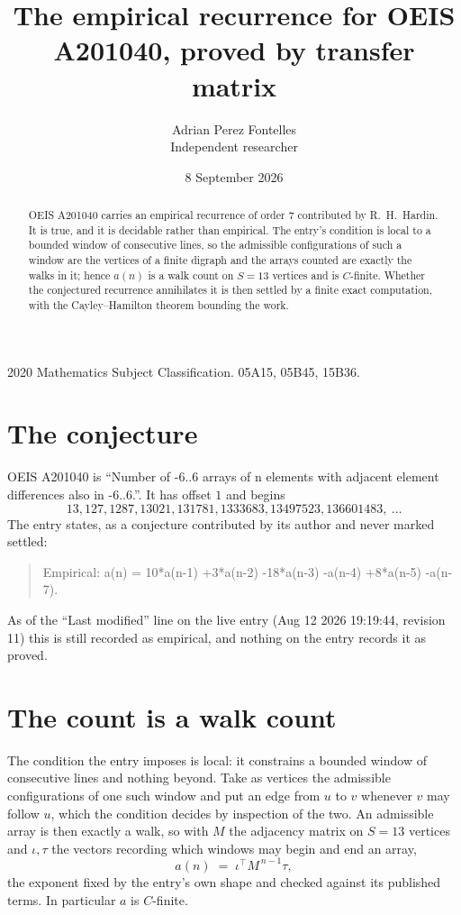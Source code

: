 \documentclass[11pt,a4paper]{article}
\title{The empirical recurrence for OEIS A201040, proved by transfer matrix}
\author{Adrian Perez Fontelles\\ \small Independent researcher}
\date{8 September 2026}
\theoremstyle{plain}
\theoremstyle{definition}
\begin{document}
\maketitle

\begin{abstract}
OEIS A201040 carries an empirical recurrence of order $7$ contributed by R.~H.~Hardin. It is
true, and it is decidable rather than empirical. The entry's condition is local to a bounded window of consecutive lines, so
the admissible configurations of such a window are the vertices of a finite digraph and the
arrays counted are exactly the walks in it; hence $a(n)$ is a walk count on $S=13$ vertices
and is $C$-finite. Whether the conjectured recurrence annihilates it is then settled by a
finite exact computation, with the Cayley--Hamilton theorem bounding the work.
\end{abstract}

\noindent\small 2020 Mathematics Subject Classification. 05A15, 05B45, 15B36.\normalsize

\section{The conjecture}

OEIS A201040 is ``Number of -6..6 arrays of n elements with adjacent element differences also in -6..6.''. It has offset $1$ and begins
\[
13, 127, 1287, 13021, 131781, 1333683, 13497523, 136601483,\ \dots
\]
The entry states, as a conjecture contributed by its author and never marked settled:
\begin{quote}
Empirical: a(n) = 10*a(n-1) +3*a(n-2) -18*a(n-3) -a(n-4) +8*a(n-5) -a(n-7).
\end{quote}
As of the ``Last modified'' line on the live entry (Aug 12 2026 19:19:44, revision 11) this is still
recorded as empirical, and nothing on the entry records it as proved.

\section{The count is a walk count}

The condition the entry imposes is local: it constrains a bounded window of consecutive lines and nothing beyond. Take as
vertices the admissible configurations of one such window and put an edge from $u$ to $v$
whenever $v$ may follow $u$, which the condition decides by inspection of the two. An
admissible array is then exactly a walk, so with $M$ the adjacency matrix on $S=13$ vertices
and $\iota,\tau$ the vectors recording which windows may begin and end an array,
\[
a(n)\;=\;\iota^{\!\top}M^{\,n-1}\tau ,
\]
the exponent fixed by the entry's own shape and checked against its published terms. In
particular $a$ is $C$-finite.
\end{document}
